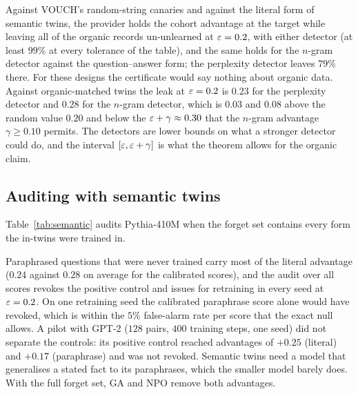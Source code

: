 \begin{table}[t]
\centering\small
\caption{A selective provider guided by each detector: canary miss rate (an upper bound
on the cohort advantage the audit sees) and fraction of organic records left un-unlearned,
at three target miss rates, with thresholds and score orientation chosen on training folds
($400$ canaries, $400$ organic records). Random selection leaves a fraction equal to the
miss rate.}
\label{tab:selective}

\end{table}

Against VOUCH's random-string canaries and against the literal form of semantic twins, the
provider holds the cohort advantage at the target while leaving all of the organic records
un-unlearned at $\varepsilon=0.2$, with either detector (at least $99\%$ at every tolerance of the
table), and the same holds for the $n$-gram detector against the question--answer form; the
perplexity detector leaves $79\%$ there. For these designs the certificate would say
nothing about organic data. Against organic-matched twins the leak at $\varepsilon=0.2$ is $0.23$
for the perplexity detector and $0.28$ for the $n$-gram detector, which is $0.03$ and
$0.08$ above the random value $0.20$ and below the $\varepsilon+\gamma\approx0.30$ that the
$n$-gram advantage $\gamma\ge0.10$ permits. The detectors are lower bounds on what a
stronger detector could do, and the interval $[\varepsilon,\varepsilon+\gamma]$ is what the theorem
allows for the organic claim.

\subsection{Auditing with semantic twins}\label{sec:exp-semantic}

Table~\ref{tab:semantic} audits Pythia-410M when the forget set contains every form the
in-twins were trained in.

\begin{table}[t]
\centering\small
\caption{Semantic-twin audit on Pythia-410M with the full forget set ($m=384$, three
seeds). Realised advantages of the calibrated literal and paraphrase scores per seed, and
the two-sided verdict over all scores (I issued, R revoked, U undetermined).}
\label{tab:semantic}

\end{table}

Paraphrased questions that were never trained carry most of the literal advantage
($0.24$ against $0.28$ on average for the calibrated scores), and the audit over all scores revokes the positive control and issues for
retraining in every seed at $\varepsilon=0.2$. On one retraining seed the calibrated paraphrase
score alone would have revoked, which is within the $5\%$ false-alarm rate per score that
the exact null allows. A pilot with GPT-2 ($128$ pairs, $400$ training steps, one seed)
did not separate the controls: its positive control reached advantages of $+0.25$
(literal) and $+0.17$ (paraphrase) and was not revoked. Semantic twins need a model that
generalises a stated fact to its paraphrases, which the smaller model barely does. With
the full forget set, GA and NPO remove both advantages.

